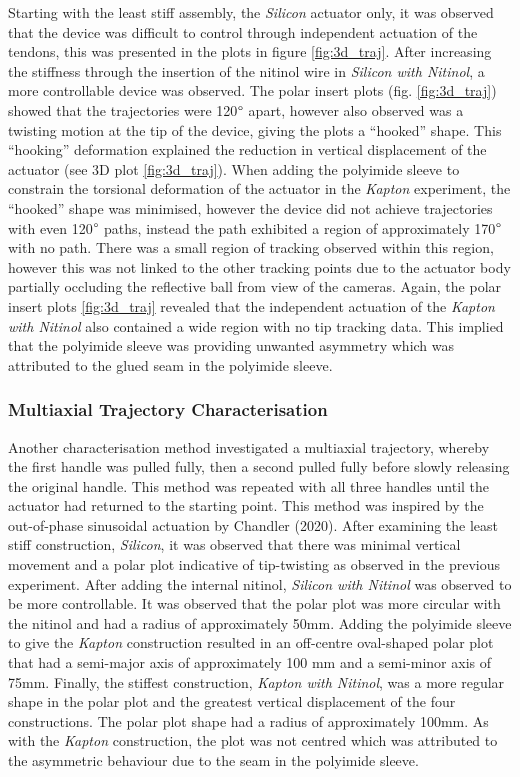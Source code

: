 Starting with the least stiff assembly, the \textit{Silicon} actuator only, it was observed that the device was difficult to control through independent actuation of the tendons, this was presented in the plots in figure \ref{fig:3d_traj}. After increasing the stiffness through the insertion of the nitinol wire in \textit{Silicon with Nitinol}, a more controllable device was observed. The polar insert plots (fig. \ref{fig:3d_traj}) showed that the trajectories were 120$\degree$ apart, however also observed was a twisting motion at the tip of the device, giving the plots a ``hooked'' shape. This ``hooking'' deformation explained the reduction in vertical displacement of the actuator (see 3D plot \ref{fig:3d_traj}). When adding the polyimide sleeve to constrain the torsional deformation of the actuator in the \textit{Kapton} experiment, the ``hooked'' shape was minimised, however the device did not achieve trajectories with even 120$\degree$ paths, instead the path exhibited a region of approximately 170$\degree$ with no path. There was a small region of tracking observed within this region, however this was not linked to the other tracking points due to the actuator body partially occluding the reflective ball from view of the cameras. Again, the polar insert plots \ref{fig:3d_traj} revealed that the independent actuation of the \textit{Kapton with Nitinol} also contained a wide region with no tip tracking data. This implied that the polyimide sleeve was providing unwanted asymmetry which was attributed to the glued seam in the polyimide sleeve.  


\subsubsection{Multiaxial Trajectory Characterisation}


Another characterisation method investigated a multiaxial trajectory, whereby the first handle was pulled fully, then a second pulled fully before slowly releasing the original handle. This method was repeated with all three handles until the actuator had returned to the starting point. This method was inspired by the out-of-phase sinusoidal actuation by Chandler (2020)\cite{chandler2020parallel}. After examining the least stiff construction, \textit{Silicon}, it was observed that there was minimal vertical movement and a polar plot indicative of tip-twisting as observed in the previous experiment. After adding the internal nitinol, \textit{Silicon with Nitinol} was observed to be more controllable. It was observed that the polar plot was more circular with the nitinol and had a radius of approximately 50mm. Adding the polyimide sleeve to give the \textit{Kapton} construction resulted in an off-centre oval-shaped polar plot that had a semi-major axis of approximately 100 mm and a semi-minor axis of 75mm. Finally, the stiffest construction, \textit{Kapton with Nitinol}, was a more regular shape in the polar plot and the greatest vertical displacement of the four constructions. The polar plot shape had a radius of approximately 100mm. As with the \textit{Kapton} construction, the plot was not centred which was attributed to the asymmetric behaviour due to the seam in the polyimide sleeve.  

